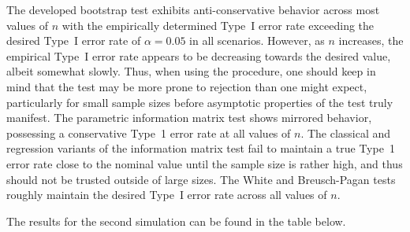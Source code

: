 \documentclass[12pt]{article} %
\theoremstyle{definition}
\begin{document}
\begin{table}[H]
	\centering
	
	\small\addtolength{\tabcolsep}{-3pt}
	\setlength\extrarowheight{-3pt}
	{
	}
\end{table}

The developed bootstrap test exhibits anti-conservative behavior across most values of $n$ with the empirically determined Type~I error rate exceeding the desired Type~I error rate
of $\alpha = 0.05$ in all scenarios. However, as $n$ increases, the empirical Type~I error rate appears to be decreasing towards the desired value, albeit somewhat slowly. Thus, when
using the procedure, one should keep in mind that the test may be more prone to
rejection than one might expect, particularly for small sample sizes before asymptotic properties of the test truly manifest. The parametric information matrix test shows mirrored behavior,
possessing a conservative Type~1 error rate at all values of $n$. The classical and regression variants of the information matrix test fail to maintain a true Type~1 error rate close
to the nominal value until the sample size is rather high, and thus should not be trusted outside of large sizes. The White and Breusch-Pagan tests roughly maintain the desired Type~I error rate across all values of $n$.

The results for the second simulation can be found in the table below.
\end{document}
